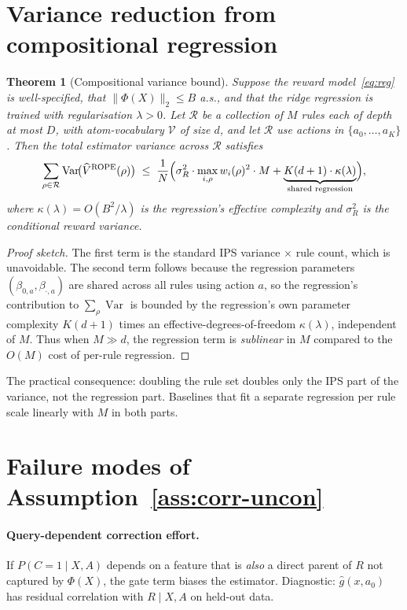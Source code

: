 \documentclass[11pt]{article}
\newtheorem{theorem}{Theorem}
\DeclareMathOperator{\Var}{Var}
\begin{document}
\section{Variance reduction from compositional regression}

\begin{theorem}[Compositional variance bound]\label{thm:variance}
Suppose the reward model~\eqref{eq:reg} is well-specified, that
$\|\Phi(X)\|_2 \le B$ a.s., and that the ridge regression is trained
with regularisation $\lambda > 0$.  Let $\mathcal{R}$ be a collection
of $M$ rules each of depth at most $D$, with atom-vocabulary
$\mathcal{V}$ of size $d$, and let $\mathcal R$ use actions in
$\{a_0, \ldots, a_K\}$.  Then the \emph{total} estimator variance
across $\mathcal{R}$ satisfies
\begin{equation*}
\sum_{\rho \in \mathcal{R}} \Var\!\bigl(\widehat V^{\text{ROPE}}(\rho)\bigr)
\;\le\;
\frac{1}{N}\Bigl(\sigma_R^2 \cdot \max_{i,\rho} w_i(\rho)^2 \cdot M
+ \underbrace{K (d + 1) \cdot \kappa(\lambda)}_{\textrm{shared regression}}\Bigr),
\end{equation*}
where $\kappa(\lambda) = O(B^2/\lambda)$ is the regression's effective
complexity and $\sigma_R^2$ is the conditional reward variance.
\end{theorem}

\begin{proof}[Proof sketch]
The first term is the standard IPS variance $\times$ rule count, which
is unavoidable.  The second term follows because the regression
parameters $(\beta_{0, a}, \beta_{\cdot, a})$ are shared across all
rules using action $a$, so the regression's contribution to
$\sum_\rho \Var$ is bounded by the regression's own parameter
complexity $K(d + 1)$ times an effective-degrees-of-freedom
$\kappa(\lambda)$, independent of $M$.  Thus when $M \gg d$, the
regression term is \emph{sublinear} in $M$ compared to the $O(M)$
cost of per-rule regression.
\end{proof}

The practical consequence: doubling the rule set doubles only the IPS
part of the variance, not the regression part.  Baselines that fit a
separate regression per rule scale linearly with $M$ in both parts.

\section{Failure modes of Assumption~\ref{ass:corr-uncon}}

\paragraph{Query-dependent correction effort.}
If $P(C=1 \mid X, A)$ depends on a feature that is \emph{also} a
direct parent of $R$ not captured by $\Phi(X)$, the gate term biases
the estimator.  Diagnostic: $\widehat g(x, a_0)$ has residual
correlation with $R \mid X, A$ on held-out data.
\end{document}
